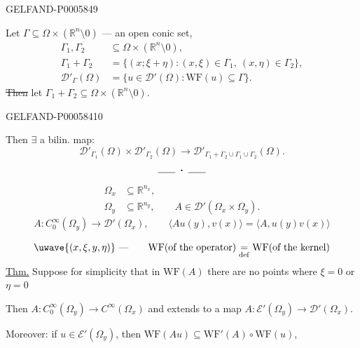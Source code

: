 \begin{GelfandAdjacentEvidence}{GELFAND-P000584}{9}


Let \(\Gamma\subseteq\Omega\times(\mathbb R^n\setminus0)\) — an open conic set,
\[
\begin{aligned}
\Gamma_1,\Gamma_2&\subseteq\Omega\times(\mathbb R^n\setminus0),\\
\Gamma_1+\Gamma_2&=\{(x;\xi+\eta):(x,\xi)\in\Gamma_1,\ (x,\eta)\in\Gamma_2\},\\
\mathcal D'_\Gamma(\Omega)&=\{u\in\mathcal D'(\Omega):\mathrm{WF}(u)\subseteq\Gamma\}.
\end{aligned}
\]
\sout{Then \textellipsis{}} let
\(\Gamma_1+\Gamma_2\subseteq\Omega\times(\mathbb R^n\setminus0)\).
\end{GelfandAdjacentEvidence}
\begin{GelfandAdjacentEvidence}{GELFAND-P000584}{10}


Then \(\exists\) a bilin. map:
\[
\mathcal D'_{\Gamma_1}(\Omega)\times\mathcal D'_{\Gamma_2}(\Omega)
\longrightarrow\mathcal D'_{\Gamma_1+\Gamma_2\cup\Gamma_1\cup\Gamma_2}(\Omega).
\]
\[
\rule{1.8em}{.4pt}\;\boldsymbol{\cdot}\;\rule{1.8em}{.4pt}
\]
\[
\begin{aligned}
\Omega_x&\subseteq\mathbb R^{n_x},\\
\Omega_y&\subseteq\mathbb R^{n_y},\qquad A\in\mathcal D'(\Omega_x\times\Omega_y).
\end{aligned}
\]
\[
A:C_0^\infty(\Omega_y)\to\mathcal D'(\Omega_x),\qquad
\langle Au(y),v(x)\rangle=\langle A,u(y)v(x)\rangle
\]
\end{GelfandAdjacentEvidence}

\[
\text{\uwave{\mbox{\((x,\xi,y,\eta)\)}}}\ \text{—}\qquad
\mathrm{WF}(\text{of the operator})\underset{\mathrm{def}}{=}\mathrm{WF}(\text{of the kernel})
\]
\underline{\underline{Thm.}} Suppose for simplicity that in
\(\mathrm{WF}(A)\) there are no points where \(\xi=0\) or \(\eta=0\)

Then \(A:C_0^\infty(\Omega_y)\to C^\infty(\Omega_x)\) and extends to a map
\(A:\mathcal E'(\Omega_y)\to\mathcal D'(\Omega_x)\).

Moreover: if \(u\in\mathcal E'(\Omega_y)\), then
\(\mathrm{WF}(Au)\subseteq\mathrm{WF}'(A)\circ\mathrm{WF}(u)\),



